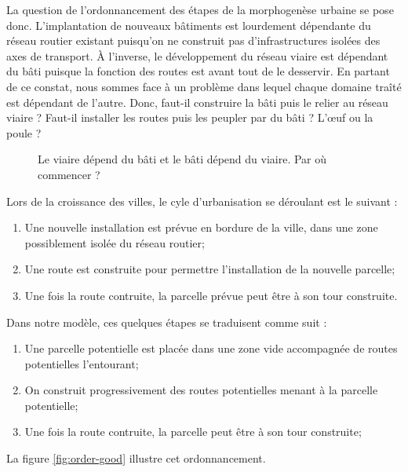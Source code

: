 \documentclass[10pt]{article}
\begin{document}
La question de l'ordonnancement des étapes de la morphogenèse urbaine
se pose donc. L'implantation de nouveaux bâtiments est lourdement
dépendante du réseau routier existant puisqu'on ne construit pas
d'infrastructures isolées des axes de transport. \`A l'inverse, le
développement du réseau viaire est dépendant du bâti puisque la
fonction des routes est avant tout de le desservir. En partant de ce
constat, nous sommes face à un problème dans lequel chaque domaine
traîté est dépendant de l'autre. Donc, faut-il construire la bâti puis
le relier au réseau viaire ? Faut-il installer les routes puis les
peupler par du bâti ?  L'\oe uf ou la poule ?

\begin{figure}[H]
  \centering
  
  \caption{Le viaire dépend du bâti et le bâti dépend du viaire. Par
    où commencer ?}
  \label{fig:bati-viaire}
\end{figure}

Lors de la croissance des villes, le cyle d'urbanisation se déroulant
est le suivant :

\begin{enumerate}
\item{Une nouvelle installation est prévue en bordure de la ville,
  dans une zone possiblement isolée du réseau routier;}
\item{Une route est construite pour permettre l'installation de la
  nouvelle parcelle;}
\item{Une fois la route contruite, la parcelle prévue peut être à son tour construite.}
\end{enumerate}

Dans notre modèle, ces quelques étapes se traduisent comme suit :

\begin{enumerate}
\item{Une parcelle potentielle est placée dans une zone vide
  accompagnée de routes potentielles l'entourant;}
\item{On construit progressivement des routes potentielles menant à la
  parcelle potentielle;}
\item{Une fois la route contruite, la parcelle peut être à son tour
  construite;}
\end{enumerate}

La figure \ref{fig:order-good} illustre cet ordonnancement.
\end{document}
